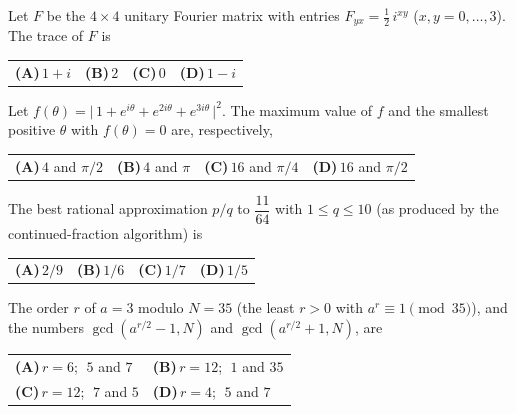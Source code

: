 \documentclass[11pt,a4paper]{article}
\newcommand{\optlabel}[1]{\textbf{(#1)}}
\newenvironment{qitem}[1]{\begin{list}{}{\setlength{\leftmargin}{3.3em}\setlength{\labelwidth}{3.1em}%
  \setlength{\labelsep}{0.2em}\setlength{\topsep}{3pt}\setlength{\parsep}{3pt}}\item[\textbf{Q.#1}\hfill]}{\end{list}}
\newcommand{\qsep}{\par\vspace{2pt}{\color{black!15}\hrule}\vspace{4pt}}
\begin{document}
\begin{qitem}{5}
Let $F$ be the $4\times4$ unitary Fourier matrix with entries $F_{yx} = \tfrac12\, i^{xy}$ ($x, y = 0, \dots, 3$).
The trace of $F$ is
\par\smallskip\noindent\begin{tabularx}{\linewidth}{@{}*{4}{L}@{}}
\optlabel{A}\,$1 + i$ & \optlabel{B}\,$2$ & \optlabel{C}\,$0$ & \optlabel{D}\,$1 - i$
\end{tabularx}
\end{qitem}
\qsep

\begin{qitem}{6}
Let $f(\theta) = \big|\,1 + e^{i\theta} + e^{2i\theta} + e^{3i\theta}\,\big|^2$. The maximum value of $f$ and the smallest
positive $\theta$ with $f(\theta) = 0$ are, respectively,
\par\smallskip\noindent\begin{tabularx}{\linewidth}{@{}*{4}{L}@{}}
\optlabel{A}\,$4$ and $\pi/2$ & \optlabel{B}\,$4$ and $\pi$ & \optlabel{C}\,$16$ and $\pi/4$ & \optlabel{D}\,$16$ and $\pi/2$
\end{tabularx}
\end{qitem}
\qsep

\begin{qitem}{7}
The best rational approximation $p/q$ to $\dfrac{11}{64}$ with $1 \le q \le 10$ (as produced by the continued-fraction
algorithm) is
\par\smallskip\noindent\begin{tabularx}{\linewidth}{@{}*{4}{L}@{}}
\optlabel{A}\,$2/9$ & \optlabel{B}\,$1/6$ & \optlabel{C}\,$1/7$ & \optlabel{D}\,$1/5$
\end{tabularx}
\end{qitem}
\qsep

\begin{qitem}{8}
The order $r$ of $a = 3$ modulo $N = 35$ (the least $r > 0$ with $a^r \equiv 1 \pmod{35}$), and the numbers
$\gcd(a^{r/2} - 1, N)$ and $\gcd(a^{r/2} + 1, N)$, are
\par\smallskip\noindent\begin{tabularx}{\linewidth}{@{}*{2}{L}@{}}
\optlabel{A}\,$r = 6$; $\;5$ and $7$ & \optlabel{B}\,$r = 12$; $\;1$ and $35$ \\[3pt]
\optlabel{C}\,$r = 12$; $\;7$ and $5$ & \optlabel{D}\,$r = 4$; $\;5$ and $7$
\end{tabularx}
\end{qitem}
\qsep
\end{document}
